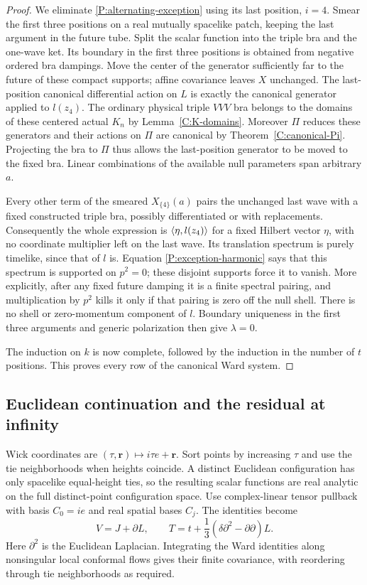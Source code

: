 \begin{proof}
We eliminate \eqref{P:alternating-exception} using its last position,
$i=4$.  Smear the first three positions on a real mutually spacelike
patch, keeping the last argument in the future tube.  Split the scalar
function into the triple bra and the one-wave ket.  Its boundary in the
first three positions is obtained from negative ordered bra dampings.
Move the center of the generator sufficiently far to the future of
these compact supports; affine covariance leaves $X$ unchanged.
The last-position canonical differential action on $L$ is exactly the
canonical generator applied to $l(z_4)$.  The ordinary physical triple
$VVV$ bra belongs to the domains of these centered actual $K_n$ by
Lemma~\ref{C:K-domains}.  Moreover $\Pi$ reduces these
generators and their actions on $\Pi$ are canonical by
Theorem~\ref{C:canonical-Pi}.  Projecting the bra to $\Pi$ thus
allows the last-position generator to be moved to the fixed bra.
Linear combinations of the available null parameters span arbitrary
$a$.

Every other term of the smeared $X_{\{4\}}(a)$ pairs the unchanged
last wave with a fixed constructed triple bra, possibly differentiated
or with replacements.  Consequently the whole expression is
$\left\langle\eta,l(z_4)\right\rangle$ for a fixed Hilbert vector $\eta$, with no
coordinate multiplier left on the last wave.  Its translation
spectrum is purely timelike, since that of $l$ is.  Equation
\eqref{P:exception-harmonic} says that this spectrum is supported on
$p^2=0$; these disjoint supports force it to vanish.  More explicitly,
after any fixed future damping it is a finite spectral pairing, and
multiplication by $p^2$ kills it only if that pairing is zero off the
null shell.  There is no shell or zero-momentum component of $l$.
Boundary uniqueness in the first three arguments and generic
polarization then give $\lambda=0$.

The induction on $k$ is now complete, followed by the induction in the
number of $t$ positions.  This proves every row of the canonical Ward
system.
\end{proof}

\subsection{Euclidean continuation and the residual at infinity}

Wick coordinates are $(\tau,\boldsymbol r)\mapsto i\tau e+\boldsymbol r$.
Sort points by increasing $\tau$ and use the tie neighborhoods when
heights coincide.  A distinct Euclidean configuration has only
spacelike equal-height ties, so the resulting scalar functions are
real analytic on the full distinct-point configuration space.  Use
complex-linear tensor pullback with basis $C_0=ie$ and real spatial
bases $C_j$.  The identities become
\begin{equation}
 V=J+\partial L,\qquad
 T=t+\frac13(\delta\partial^2-\partial\partial)L.
 \label{P:euclidean-identities}
\end{equation}
Here $\partial^2$ is the Euclidean Laplacian.  Integrating the Ward
identities along nonsingular local conformal flows gives their finite
covariance, with reordering through tie neighborhoods as required.

